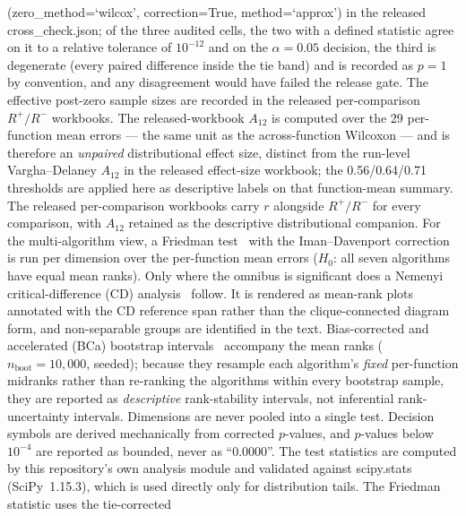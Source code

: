 (zero\_method=`wilcox', correction=True,
method=`approx') in the released cross\_check.json; of the
three audited cells, the two with a defined statistic agree on it to a
relative tolerance of $10^{-12}$ and on the $\alpha = 0.05$ decision, the
third is degenerate (every paired difference inside the tie band) and is
recorded as $p = 1$ by convention, and any disagreement would have failed
the release gate.
The effective post-zero sample sizes are recorded in the released
per-comparison $R^{+}/R^{-}$ workbooks. The released-workbook $A_{12}$ is
computed over the 29 per-function mean errors --- the same unit as the
across-function Wilcoxon --- and is therefore an \emph{unpaired}
distributional effect size, distinct from the run-level Vargha--Delaney
$A_{12}$ in the released effect-size workbook; the 0.56/0.64/0.71
thresholds are applied here as descriptive labels on that function-mean
summary. The released per-comparison workbooks carry $r$ alongside
$R^{+}/R^{-}$ for every comparison, with $A_{12}$ retained as the descriptive
distributional companion.
For the multi-algorithm view, a Friedman
test~\cite{friedman1937use} with the Iman--Davenport correction~\cite{demsar2006statistical} is
run per dimension over the per-function mean errors ($H_{0}$: all
seven algorithms have equal mean ranks). Only where the
omnibus is significant does a Nemenyi critical-difference (CD)
analysis~\cite{demsar2006statistical} follow. It is rendered as mean-rank plots
annotated with the CD reference span rather than the clique-connected
diagram form, and non-separable groups are identified in the text. Bias-corrected
and accelerated (BCa) bootstrap intervals~\cite{efron1993introduction}
accompany the mean ranks ($n_{\mathrm{boot}} = 10{,}000$, seeded); because
they resample each algorithm's \emph{fixed} per-function midranks rather than
re-ranking the algorithms within every bootstrap sample, they are reported as
\emph{descriptive} rank-stability intervals, not inferential rank-uncertainty
intervals.
Dimensions are never pooled into a single test. Decision symbols are
derived mechanically from corrected $p$-values, and $p$-values below
$10^{-4}$ are reported as bounded, never as ``0.0000''. The test statistics are computed by this repository's own analysis module and
validated against scipy.stats (SciPy~1.15.3), which is used directly
only for distribution tails. The Friedman statistic uses the tie-corrected
